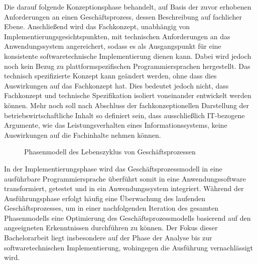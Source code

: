 Die darauf folgende Konzeptionsphase behandelt, auf Basis der zuvor erhobenen Anforderungen an einen Geschäftsprozess, dessen Beschreibung auf fachlicher Ebene. 
\cite{Schwegmann.2002}
Anschließend wird das Fachkonzept, unabhängig von Implementierungsgesichtspunkten, mit technischen Anforderungen an das Anwendungssystem angereichert, sodass es als Ausgangspunkt für eine konsistente softwaretechnische Implementierung dienen kann.
\cite{Scheer.1991}
Dabei wird jedoch noch kein Bezug zu plattformspezifischen Programmiersprachen hergestellt. 
Das technisch spezifizierte Konzept kann geändert werden, ohne dass dies Auswirkungen auf das Fachkonzept hat.
\cite{Speck.2002}
Dies bedeutet jedoch nicht, dass Fachkonzept und technische Spezifikation isoliert voneinander entwickelt werden können. 
Mehr noch soll nach Abschluss der fachkonzeptionellen Darstellung der betriebswirtschaftliche Inhalt so definiert sein, dass ausschließlich \ac{IT}-bezogene Argumente, wie das Leistungsverhalten eines Informationssystems, keine Auswirkungen auf die Fachinhalte nehmen können.  

\begin{figure}[H]
	\centering 
    \caption[Phasenmodell bei der Automatisierung von Geschäftsprozessen]
    {Phasenmodell des Lebenszyklus von Geschäftsprozessen \protect\footnotemark}
    \label{fig:Phasenmodell bei der Automatisierung von Geschäftsprozessen}
\end{figure}

In der Implementierungsphase wird das Geschäftsprozessmodell in eine ausführbare Programmiersprache überführt somit in eine Anwendungssoftware transformiert, getestet und in ein Anwendungssystem integriert.
\cite{Scheer.1991}
Während der Ausführungsphase erfolgt häufig eine Überwachung des laufenden Geschäftsprozesses, um in einer nachfolgenden Iteration des gesamten Phasenmodells eine Optimierung des Geschäftsprozessmodells basierend auf den angeeigneten Erkenntnissen durchführen zu können.
\cite{Scheer.2005}
Der Fokus dieser Bachelorarbeit liegt insbesondere auf der Phase der Analyse bis zur softwaretechnischen Implementierung, wohingegen die Ausführung vernachlässigt wird.

